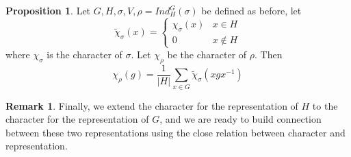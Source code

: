 \documentclass{book}
\newcommand{\abs}[1]{\lvert #1 \rvert }
\theoremstyle{definition}
\newtheorem{proposition}[lemma]{Proposition}
\theoremstyle{remarkstyle}
\newtheorem*{remark}{Remark}%
\begin{document}
\begin{proposition}
    Let $G,H,\sigma,V,\rho=Ind^G_H(\sigma)$ be defined as before, let 
    $$
    \tilde{\chi}_\sigma(x) = \left\{
    \begin{array}{ll}
        \chi_\sigma(x) & x\in H \\
        0 & x \notin H 
    \end{array}
    \right.
    $$
    where $\chi_\sigma$ is the character of $\sigma$. Let $\chi_\rho$ be the character of $\rho$. Then 
    $$
    \chi_\rho(g) = \frac{1}{\abs{H}}\sum_{x\in G}\tilde{\chi}_\sigma(xgx^{-1})
    $$
\end{proposition}
\begin{remark}
    Finally, we extend the character for the representation of $H$ to the character for the representation of $G$, and we are ready to build connection between these two representations using the close relation between character and representation.
\end{remark}
\end{document}
